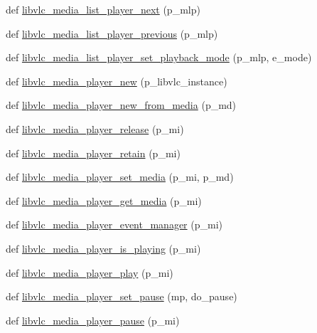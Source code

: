 \begin{DoxyCompactItemize}
\item 
def \hyperlink{namespacesrc_1_1lib_1_1vlc_abfdf24ebd4c2deabd2de9ea68c4258ac}{libvlc\+\_\+media\+\_\+list\+\_\+player\+\_\+next} (p\+\_\+mlp)
\item 
def \hyperlink{namespacesrc_1_1lib_1_1vlc_a639fa6a48f460daeff321851efe9bcc0}{libvlc\+\_\+media\+\_\+list\+\_\+player\+\_\+previous} (p\+\_\+mlp)
\item 
def \hyperlink{namespacesrc_1_1lib_1_1vlc_a2758018dd9fa38e2b5a7adea3e9b27b9}{libvlc\+\_\+media\+\_\+list\+\_\+player\+\_\+set\+\_\+playback\+\_\+mode} (p\+\_\+mlp, e\+\_\+mode)
\item 
def \hyperlink{namespacesrc_1_1lib_1_1vlc_aceed1b35f41e0ab58dd10a6e72b4a2d4}{libvlc\+\_\+media\+\_\+player\+\_\+new} (p\+\_\+libvlc\+\_\+instance)
\item 
def \hyperlink{namespacesrc_1_1lib_1_1vlc_a875819f334f3533ef18209042ce0d2d7}{libvlc\+\_\+media\+\_\+player\+\_\+new\+\_\+from\+\_\+media} (p\+\_\+md)
\item 
def \hyperlink{namespacesrc_1_1lib_1_1vlc_a01b609bd43cdf2047e56b47d5105633b}{libvlc\+\_\+media\+\_\+player\+\_\+release} (p\+\_\+mi)
\item 
def \hyperlink{namespacesrc_1_1lib_1_1vlc_a6d68ac555c0483fa1e5685aed52b12c5}{libvlc\+\_\+media\+\_\+player\+\_\+retain} (p\+\_\+mi)
\item 
def \hyperlink{namespacesrc_1_1lib_1_1vlc_ac80c59f1a4caba1cf49dc2cb560781ed}{libvlc\+\_\+media\+\_\+player\+\_\+set\+\_\+media} (p\+\_\+mi, p\+\_\+md)
\item 
def \hyperlink{namespacesrc_1_1lib_1_1vlc_a9fa60e445a637a1261b2a4f1f8c21767}{libvlc\+\_\+media\+\_\+player\+\_\+get\+\_\+media} (p\+\_\+mi)
\item 
def \hyperlink{namespacesrc_1_1lib_1_1vlc_aa733d0b3115cb697aaa092c4aa61b604}{libvlc\+\_\+media\+\_\+player\+\_\+event\+\_\+manager} (p\+\_\+mi)
\item 
def \hyperlink{namespacesrc_1_1lib_1_1vlc_ad1becf134bf7421bc9efca43c9efc2ff}{libvlc\+\_\+media\+\_\+player\+\_\+is\+\_\+playing} (p\+\_\+mi)
\item 
def \hyperlink{namespacesrc_1_1lib_1_1vlc_a6807c93638104bd9a630d90cc430c57f}{libvlc\+\_\+media\+\_\+player\+\_\+play} (p\+\_\+mi)
\item 
def \hyperlink{namespacesrc_1_1lib_1_1vlc_a24a227c664bb7a002fd0e6447c88cebb}{libvlc\+\_\+media\+\_\+player\+\_\+set\+\_\+pause} (mp, do\+\_\+pause)
\item 
def \hyperlink{namespacesrc_1_1lib_1_1vlc_ad57f9a6f82043216b5d8fd7b0f2ce0f6}{libvlc\+\_\+media\+\_\+player\+\_\+pause} (p\+\_\+mi)

\end{DoxyCompactItemize}
